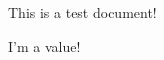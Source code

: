 \documentclass[12pt]{article}
\begin{document}
This is a test document!

I'm a value!
\end{document}
